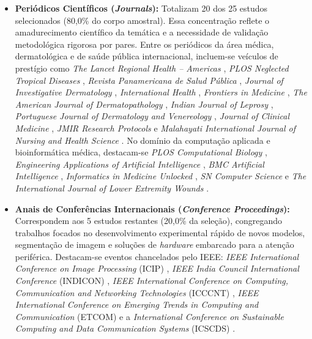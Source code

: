 \begin{itemize}
    \item \textbf{Periódicos Científicos (\textit{Journals}):} Totalizam 20 dos 25 estudos selecionados (80,0\% do corpo amostral). Essa concentração reflete o amadurecimento científico da temática e a necessidade de validação metodológica rigorosa por pares. Entre os periódicos da área médica, dermatológica e de saúde pública internacional, incluem-se veículos de prestígio como \textit{The Lancet Regional Health -- Americas} , \textit{PLOS Neglected Tropical Diseases} , \textit{Revista Panamericana de Salud Pública} , \textit{Journal of Investigative Dermatology} , \textit{International Health} , \textit{Frontiers in Medicine} , \textit{The American Journal of Dermatopathology} , \textit{Indian Journal of Leprosy} , \textit{Portuguese Journal of Dermatology and Venereology} , \textit{Journal of Clinical Medicine} , \textit{JMIR Research Protocols}  e \textit{Malahayati International Journal of Nursing and Health Science} . No domínio da computação aplicada e bioinformática médica, destacam-se \textit{PLOS Computational Biology} , \textit{Engineering Applications of Artificial Intelligence} , \textit{BMC Artificial Intelligence} , \textit{Informatics in Medicine Unlocked} , \textit{SN Computer Science}  e \textit{The International Journal of Lower Extremity Wounds} .

    \item \textbf{Anais de Conferências Internacionais (\textit{Conference Proceedings}):} Correspondem aos 5 estudos restantes (20,0\% da seleção), congregando trabalhos focados no desenvolvimento experimental rápido de novos modelos, segmentação de imagem e soluções de \textit{hardware} embarcado para a atenção periférica. Destacam-se eventos chancelados pelo IEEE: \textit{IEEE International Conference on Image Processing} (ICIP) , \textit{IEEE India Council International Conference} (INDICON) , \textit{IEEE International Conference on Computing, Communication and Networking Technologies} (ICCCNT) , \textit{IEEE International Conference on Emerging Trends in Computing and Communication} (ETCOM)  e a \textit{International Conference on Sustainable Computing and Data Communication Systems} (ICSCDS) .
\end{itemize}


